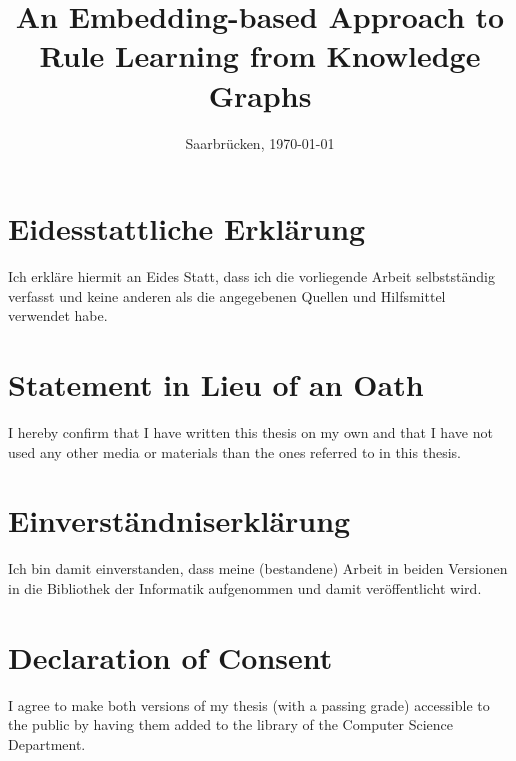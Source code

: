 \documentclass[11pt, a4paper, twoside]{Thesis}
\begin{document}


\frontmatter

\title  {An Embedding-based Approach to\\ 
Rule Learning from Knowledge Graphs}

\addresses  {\groupname\\\deptname\\\univname}  %
\date       {Saarbr\"ucken, \today }
\subject    {}
\keywords   {}

\maketitle



\thispagestyle{empty}

\section*{Eidesstattliche Erkl\"{a}rung}
Ich erkl\"{a}re hiermit an Eides Statt, dass ich die vorliegende Arbeit selbstst\"{a}ndig verfasst und keine
anderen als die angegebenen Quellen und Hilfsmittel verwendet habe.

\vspace{0.60cm}
\section*{Statement in Lieu of an Oath}
I hereby confirm that I have written this thesis on my own and that I have not used any other media or
materials than the ones referred to in this thesis.
\vspace{1.5cm}

\section*{Einverst\"{a}ndniserkl\"{a}rung}
Ich bin damit einverstanden, dass meine (bestandene) Arbeit in beiden Versionen in die Bibliothek der
Informatik aufgenommen und damit ver\"{o}ffentlicht wird.

\vspace{0.60cm}
\section*{Declaration of Consent}
I agree to make both versions of my thesis (with a passing grade) accessible to the public by having
them added to the library of the Computer Science Department.
\vspace{3cm}
\end{document}
